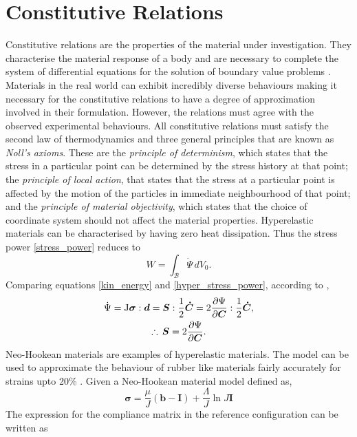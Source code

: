 \section{Constitutive Relations}
Constitutive relations are the properties of the material under investigation. They characterise the material response of a body and
 are necessary to complete the system of differential equations for the solution of boundary value problems \cite{itskov2020}. Materials in the real world can exhibit incredibly diverse behaviours making it necessary for the constitutive relations to
 have a degree of approximation involved in their formulation. However, the relations must agree with the observed experimental behaviours. All constitutive relations must satisfy the 
 second law of thermodynamics and three general principles that are known as \emph{Noll's axioms}.
 These are the \emph{principle of determinism}, which states that the stress in a particular point can be determined by 
 the stress history at that point; the \emph{principle of local action},
 that states that the stress at a particular point is affected by the motion of the particles in
 immediate neighbourhood of that point; and the \emph{principle of material objectivity}, which states that the choice of coordinate
 system should not affect the material properties. 
Hyperelastic materials can be characterised by having zero heat dissipation. Thus the stress power \eqref{stress_power}
 reduces to
 \begin{equation}\label{hyper_stress_power}
    W = \int_{\mathcal{B}} \dot{\Psi}\,dV_{0}.
 \end{equation}
Comparing equations \eqref{kin_energy} and \eqref{hyper_stress_power}, according to \cite{itskov2020},
 \begin{gather}\label{S_is_Psi}
    \dot{\Psi} = \mathrm{J} \boldsymbol{\sigma} : \mathrm{\boldsymbol{d}} = \mathrm{\boldsymbol{S}} : \frac{1}{2}\mathrm{\boldsymbol{\dot{C}}} = 2 \frac{\partial \Psi}{\partial \mathrm{\boldsymbol{C}}} : \frac{1}{2} \mathrm{\boldsymbol{\dot{C}}}, \notag\\
    \therefore \, \mathrm{\boldsymbol{S}}  = 2 \frac{\partial \Psi}{\partial \mathrm{\boldsymbol{C}}}.
\end{gather}
Neo-Hookean materials are examples of hyperelastic materials. The model can be used to approximate the behaviour of
 rubber like materials fairly accurately for strains upto 20\% \cite{gent2001}. Given a Neo-Hookean material model defined as,
\begin{equation} \label{neo_hookean_definition}
{\boldsymbol{\sigma} = \frac{\mu}{J}\left(\boldsymbol{b}-\boldsymbol{I}\right) + \frac{\Lambda}{J}\ln{J}\boldsymbol{I}}
\end{equation}
The expression for the compliance matrix in the reference configuration can be written as

